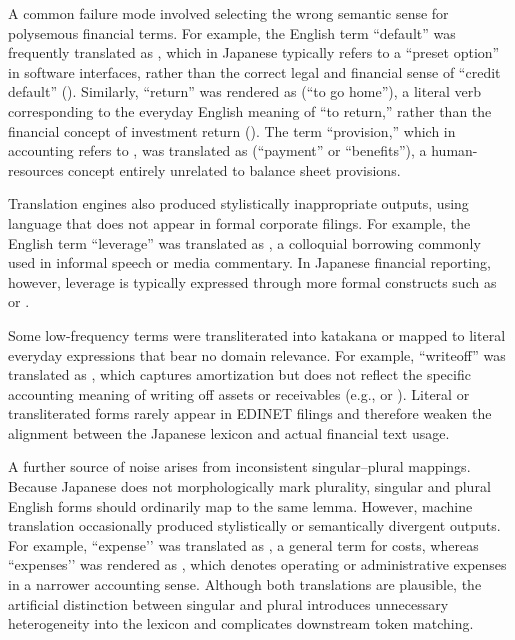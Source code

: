 A common failure mode involved selecting the wrong semantic sense for polysemous financial terms. 
For example, the English term ``default'' was frequently translated as , which in Japanese typically refers to a ``preset option'' in software interfaces, rather than the correct legal and financial sense of ``credit default'' (). 
Similarly, ``return'' was rendered as  (“to go home”), a literal verb corresponding to the everyday English meaning of “to return,” rather than the financial concept of investment return (). 
The term ``provision,'' which in accounting refers to , was translated as  (“payment” or “benefits”), a human-resources concept entirely unrelated to balance sheet provisions.

Translation engines also produced stylistically inappropriate outputs, using language that does not appear in formal corporate filings. 
For example, the English term ``leverage'' was translated as , a colloquial borrowing commonly used in informal speech or media commentary. 
In Japanese financial reporting, however, leverage is typically expressed through more formal constructs such as  or .

Some low-frequency terms were transliterated into katakana or mapped to literal everyday expressions that bear no domain relevance.
For example, ``writeoff'' was translated as , which captures amortization but does not reflect the specific accounting meaning of writing off assets or receivables (e.g.,  or ). 
Literal or transliterated forms rarely appear in EDINET filings and therefore weaken the alignment between the Japanese lexicon and actual financial text usage.

A further source of noise arises from inconsistent singular–plural mappings. 
Because Japanese does not morphologically mark plurality, singular and plural English forms should ordinarily map to the same lemma. However, machine translation occasionally produced stylistically or semantically divergent outputs. 
For example, “expense’’ was translated as , a general term for costs, whereas “expenses’’ was rendered as , which denotes operating or administrative expenses in a narrower accounting sense. 
Although both translations are plausible, the artificial distinction between singular and plural introduces unnecessary heterogeneity into the lexicon and complicates downstream token matching.


